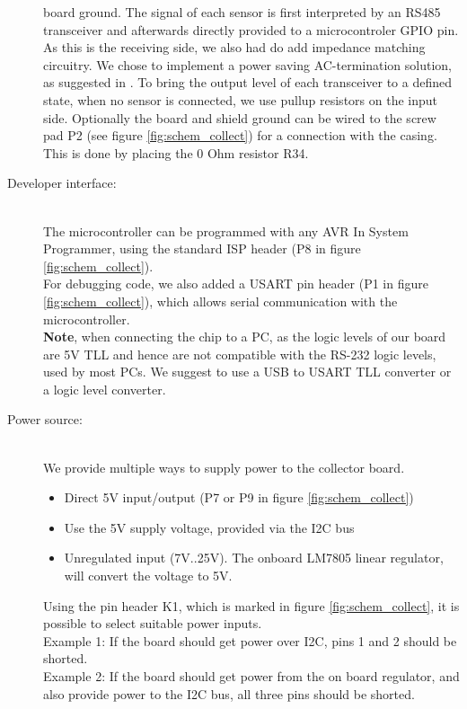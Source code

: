 \documentclass[a4paper]{scrreprt}
\begin{document}
\begin{description}
    board ground. The signal of each sensor is first interpreted
    by an RS485 transceiver and afterwards directly provided to a
    microcontroler GPIO pin. As this is the receiving side, we also
    had do add impedance matching circuitry. We chose to implement
    a power saving AC-termination solution, as suggested in \cite{st485appnote, rs485}.
    To bring the output level of each transceiver to a defined state,
    when no sensor is connected, we use pullup resistors on the
    input side. Optionally the board and shield ground can be wired to
    the screw pad P2 (see figure \ref{fig:schem_collect}) for a connection with the casing. This is done by
    placing the 0 Ohm resistor R34.
  \item[Developer interface:]\hspace{1cm}\\
    The microcontroller can be programmed with any AVR In System
    Programmer, using the standard ISP header (P8 in figure \ref{fig:schem_collect}).\\
    For debugging code, we also added a USART pin header (P1 in figure \ref{fig:schem_collect}), which
    allows serial communication with the microcontroller. 
    \\
    \textbf{Note}, when connecting the chip to a PC, as the logic
    levels of our board are 5V TLL and hence are not compatible
    with the RS-232 logic levels, used by most PCs. We suggest to use
    a USB to USART TLL converter or a logic level converter.
  \item[Power source:]\hspace{1cm}\\
    We provide multiple ways to supply power to the collector board.
    \begin{itemize}
      \item Direct 5V input/output (P7 or P9 in figure \ref{fig:schem_collect})
      \item Use the 5V supply voltage, provided via the I2C bus
      \item Unregulated input (7V..25V). The onboard LM7805 linear
        regulator, will convert the voltage to 5V.
    \end{itemize}
    Using the pin header K1, which is marked in figure \ref{fig:schem_collect}, it is possible to select suitable
    power inputs.\\
    Example 1: If the board should get power over I2C, pins 1 and 2
    should be shorted.\\
    Example 2: If the board should get power from the on board
    regulator, and also provide power to the I2C bus, all three pins
    should be shorted.
\end{description}
\end{document}
